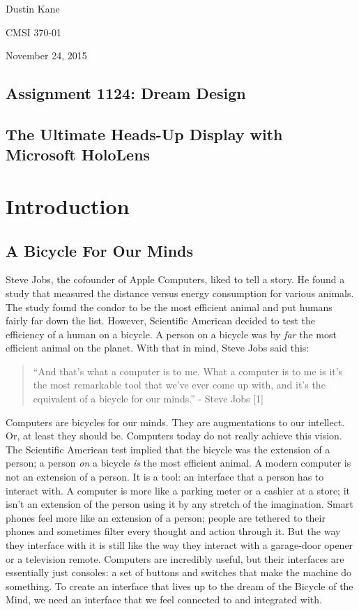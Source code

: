 \documentclass[a4paper,12pt]{article}
\begin{document}
Dustin Kane

CMSI 370-01

November 24, 2015

\begin{center}
\section*{Assignment 1124: Dream Design}
\subsection*{The Ultimate Heads-Up Display with Microsoft HoloLens}
\end{center}

\section{Introduction}
\subsection{A Bicycle For Our Minds}

Steve Jobs, the cofounder of Apple Computers, liked to tell a story. He found a study that measured the distance versus energy consumption for various animals. The study found the condor to be the most efficient animal and put humans fairly far down the list. However, Scientific American decided to test the efficiency of a human on a bicycle. A person on a bicycle was by \emph{far} the most efficient animal on the planet. With that in mind, Steve Jobs said this:

\begin{quote} 
    ``And that's what a computer is to me. What a computer is to me is it's the most remarkable tool that we've ever come up with, and it's the equivalent of a bicycle for our minds.'' - Steve Jobs [1]
\end{quote}

Computers are bicycles for our minds. They are augmentations to our intellect. Or, at least they should be. Computers today do not really achieve this vision. The Scientific American test implied that the bicycle was the extension of a person; a person \emph{on} a bicycle \emph{is} the most efficient animal. A modern computer is not an extension of a person. It is a tool: an interface that a person has to interact with. A computer is more like a parking meter or a cashier at a store; it isn't an extension of the person using it by any stretch of the imagination. Smart phones feel more like an extension of a person; people are tethered to their phones and sometimes filter every thought and action through it. But the way they interface with it is still like the way they interact with a garage-door opener or a television remote. Computers are incredibly useful, but their interfaces are essentially just consoles: a set of buttons and switches that make the machine do something. To create an interface that lives up to the dream of the Bicycle of the Mind, we need an interface that we feel connected to and integrated with.
\end{document}
